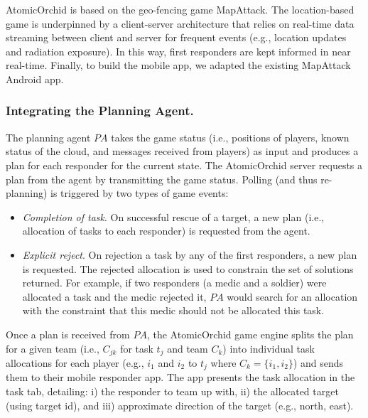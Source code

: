  AtomicOrchid is based on the geo-fencing game MapAttack. The location-based game is underpinned by a client-server architecture that relies on real-time data streaming between client and server for frequent events (e.g., location updates and radiation exposure). In this way, first responders are kept informed in near real-time. Finally,  to build the mobile app, we adapted the existing MapAttack Android app.


\subsubsection{Integrating the Planning Agent.}
\noindent The planning agent $PA$ takes the game status (i.e., positions of players, known status of the cloud, and messages received from players) as input and produces a plan for each responder  for the current state.  The AtomicOrchid server requests a plan from the agent by transmitting the game status. Polling (and thus re-planning) is triggered by two types of game events:
\begin{itemize}
\item \textit{Completion of task}. On successful rescue of a target, a new plan (i.e., allocation of tasks to each responder) is requested from the agent.
\item \textit{Explicit reject}. On rejection a task by any of the first responders, a new plan is requested. The rejected allocation is used to constrain the set of solutions returned. For example, if two responders (a medic and a soldier) were allocated a task and the medic rejected it, $PA$ would search for an  allocation with the constraint that this medic should not be allocated this task.
\end{itemize} 

Once a plan is received from $PA$, the AtomicOrchid game engine splits the plan  for a given team (i.e., $C_{jk}$ for task $t_j$ and team $C_k$) into individual task allocations for each player (e.g., $i_1$ and $i_2$ to $t_j$ where $C_k = \{i_1,i_2\}$)  and sends them to their mobile responder app. The app presents the task allocation in the task tab, detailing: i) the responder to team up with, ii) the allocated target (using target id), and iii) approximate direction of the target (e.g., north, east).  %


